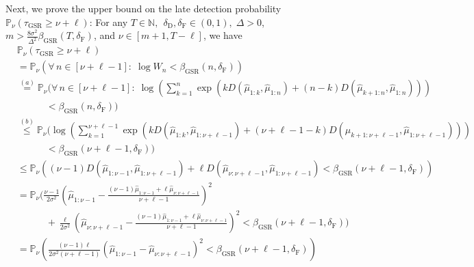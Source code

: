 \documentclass[12pt]{interact}
\newcommand{\lp}{\left(}
\newcommand{\rp}{\right)}
\newcommand{\lb}{\left[}
\newcommand{\rb}{\right]}
\newcommand{\mrm}{\mathrm}
\newcommand{\mbb}{\mathbb}
\renewcommand{\Pr}{\mathbb{P}}
\theoremstyle{plain}
\begin{document}
Next, we prove the upper bound on the late detection probability $\Pr_{\nu}\lp\tau_{\mrm{GSR}}\geq\nu+\ell\rp$: For any $T\in\mbb{N},\;\,\delta_{\mrm{D}},\delta_{\mrm{F}}\in\lp0,1\rp,\;\Delta>0$, $m>\frac{8\sigma^{2}}{\Delta^{2}}\beta_{\mrm{GSR}}\lp T,\delta_{\mrm{F}}\rp$, and $\nu\in\lb m+1,T-\ell\rb$, we have
%
\begin{align}\nonumber
    &\Pr_{\nu}\lp\tau_{\mrm{GSR}}\geq\nu+\ell\rp\\\nonumber
    &=\Pr_{\nu}\lp\forall\,n\in \lb \nu+ \ell - 1\rb: \;\log W_{n}<\beta_{\mrm{GSR}}\lp n,\delta_{\mrm{F}}\rp \rp\\\nonumber
    &\overset{(a)}{=}\Pr_{\nu}\Bigg(\forall\,n\in\lb \nu+ \ell-1\rb:\;\log\lp\sum_{k=1}^{n}\exp\lp k D \lp\hat{\mu}_{1:k},\hat{\mu}_{1:n}\rp+\lp n-k\rp D \lp\hat{\mu}_{k+1:n},\hat{\mu}_{1:n}\rp\rp\rp\\\nonumber
    &\quad\quad\quad<\beta_{\mrm{GSR}}\lp n,\delta_{\mrm{F}}\rp\Bigg)\\\nonumber
    &\overset{(b)}{\leq}\Pr_{\nu}\Bigg(\log\lp\sum_{k=1}^{\nu+ \ell - 1} \exp\lp k D \lp\hat{\mu}_{1:k},\hat{\mu}_{1: \nu + \ell - 1} \rp + \lp \nu + \ell - 1 - k\rp D \lp\hat{\mu}_{k+1:\nu+ \ell-1},\hat{\mu}_{1:\nu+ \ell-1}\rp\rp\rp \\\nonumber
    &\quad\quad\quad<\beta_{\mrm{GSR}}\lp \nu + \ell - 1, \delta_{\mrm{F}}\rp\Bigg)\\\nonumber
    &\leq\Pr_{\nu}\lp\lp\nu-1\rp D \lp\hat{\mu}_{1:\nu-1},\hat{\mu}_{1:\nu+ \ell-1}\rp+ \ell D \lp\hat{\mu}_{\nu:\nu+ \ell-1},\hat{\mu}_{1:\nu+ \ell-1}\rp<\beta_{\mrm{GSR}}\lp\nu+ \ell-1,\delta_{\mrm{F}}\rp\rp\\\nonumber
    &=\Pr_{\nu}\Bigg(\frac{\nu-1}{2\sigma^{2}}\lp\hat{\mu}_{1:\nu-1}-\frac{\lp\nu-1\rp\hat{\mu}_{1:\nu-1}+ \ell\hat{\mu}_{\nu:\nu+ \ell-1}}{\nu+ \ell-1}\rp^{2}\\\nonumber
    &\quad\quad\quad+\frac{ \ell}{2\sigma^{2}}\lp\hat{\mu}_{\nu:\nu+ \ell-1}-\frac{\lp\nu-1\rp\hat{\mu}_{1:\nu-1}+ \ell\hat{\mu}_{\nu:\nu+ \ell-1}}{\nu+ \ell-1}\rp^{2}<\beta_{\mrm{GSR}}\lp\nu+ \ell-1,\delta_{\mrm{F}}\rp\Bigg)\\
    &=\Pr_{\nu}\lp\frac{\lp\nu-1\rp \ell}{2\sigma^{2}\lp\nu+ \ell-1\rp}\lp\hat{\mu}_{1:\nu-1}-\hat{\mu}_{\nu:\nu+ \ell-1}\rp^{2}<\beta_{\mrm{GSR}}\lp\nu+ \ell-1,\delta_{\mrm{F}}\rp\rp\label{eq:gsr-ld-1}
\end{align}
\end{document}
